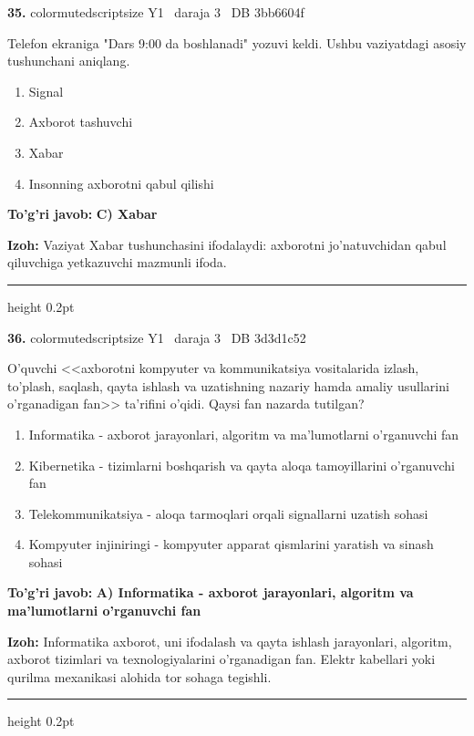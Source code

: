 \documentclass[10pt,a4paper,oneside]{article}
\begin{document}
\noindent\textbf{\color{ink}35.}  {color{muted}scriptsize Y1 \textbullet\ daraja 3 \textbullet\ DB 3bb6604f}
\par
Telefon ekraniga "Dars 9:00 da boshlanadi" yozuvi keldi. Ushbu vaziyatdagi asosiy tushunchani aniqlang.
\begin{enumerate}[label=\Alph*),leftmargin=9mm]
\item Signal
\item Axborot tashuvchi
\item Xabar
\item Insonning axborotni qabul qilishi
\end{enumerate}
\begin{tcolorbox}[enhanced,breakable,colback=teal!4,colframe=teal!50!black,boxrule=0.5pt,arc=1.1mm,left=3mm,right=3mm,top=1.7mm,bottom=1.7mm,before skip=2mm,after skip=2mm]
\textbf{\color{teal}To'g'ri javob:} \textbf{C) Xabar}
\par\smallskip
\textbf{Izoh:} Vaziyat Xabar tushunchasini ifodalaydi: axborotni jo'natuvchidan qabul qiluvchiga yetkazuvchi mazmunli ifoda.
\end{tcolorbox}
\vspace{2mm}\hrule height 0.2pt \vspace{3mm}

\noindent\textbf{\color{ink}36.}  {color{muted}scriptsize Y1 \textbullet\ daraja 3 \textbullet\ DB 3d3d1c52}
\par
O'quvchi <<axborotni kompyuter va kommunikatsiya vositalarida izlash, to'plash, saqlash, qayta ishlash va uzatishning nazariy hamda amaliy usullarini o'rganadigan fan>> ta'rifini o'qidi. Qaysi fan nazarda tutilgan?
\begin{enumerate}[label=\Alph*),leftmargin=9mm]
\item Informatika - axborot jarayonlari, algoritm va ma'lumotlarni o'rganuvchi fan
\item Kibernetika - tizimlarni boshqarish va qayta aloqa tamoyillarini o'rganuvchi fan
\item Telekommunikatsiya - aloqa tarmoqlari orqali signallarni uzatish sohasi
\item Kompyuter injiniringi - kompyuter apparat qismlarini yaratish va sinash sohasi
\end{enumerate}
\begin{tcolorbox}[enhanced,breakable,colback=teal!4,colframe=teal!50!black,boxrule=0.5pt,arc=1.1mm,left=3mm,right=3mm,top=1.7mm,bottom=1.7mm,before skip=2mm,after skip=2mm]
\textbf{\color{teal}To'g'ri javob:} \textbf{A) Informatika - axborot jarayonlari, algoritm va ma'lumotlarni o'rganuvchi fan}
\par\smallskip
\textbf{Izoh:} Informatika axborot, uni ifodalash va qayta ishlash jarayonlari, algoritm, axborot tizimlari va texnologiyalarini o'rganadigan fan. Elektr kabellari yoki qurilma mexanikasi alohida tor sohaga tegishli.
\end{tcolorbox}
\vspace{2mm}\hrule height 0.2pt \vspace{3mm}
\end{document}
